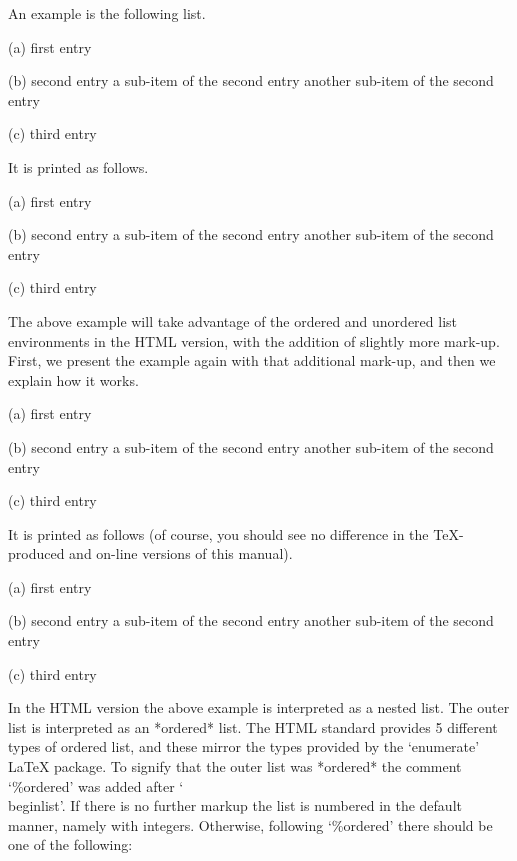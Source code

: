 An example is the following list.

\begintt
\beginlist
\item{(a)}
    first entry
\item{(b)}
    second entry
\itemitem{--}
    a sub-item of the second entry
\itemitem{--}
    another sub-item of the second entry
\item{(c)}
    third entry
\endlist
\endtt

It is printed as follows.
\beginlist
\item{(a)}
    first entry
\item{(b)}
    second entry
\itemitem{--}
    a sub-item of the second entry
\itemitem{--}
    another sub-item of the second entry
\item{(c)}
    third entry
\endlist

The above example will take advantage of the ordered and unordered list
environments in the HTML version, with the addition of slightly more mark-up.
First, we present the example again with that additional mark-up, and then
we explain how it works.

\begintt
\beginlist%
\item{(a)}
    first entry
\item{(b)}
    second entry
\itemitem{--}%
    a sub-item of the second entry
\itemitem{--}
    another sub-item of the second entry
\item{(c)}
    third entry
\endlist
\endtt

It is printed as follows (of course, you should see no difference in the
{\TeX}-produced and on-line versions of this manual).
\beginlist%
\item{(a)}
    first entry
\item{(b)}
    second entry
\itemitem{--}%
    a sub-item of the second entry
\itemitem{--}
    another sub-item of the second entry
\item{(c)}
    third entry
\endlist

In the HTML version the above example is interpreted as a nested list. The
outer list is interpreted as an *ordered* list. The HTML standard provides
5 different types of ordered list, and these mirror the types provided by the
`enumerate' La{\TeX} package. To signify that the outer list was *ordered*
the comment `\%ordered' was added after `\\beginlist'. If there is no further
markup the list is numbered in the default manner, namely with integers.
Otherwise, following `\%ordered' there should be one of the following:

